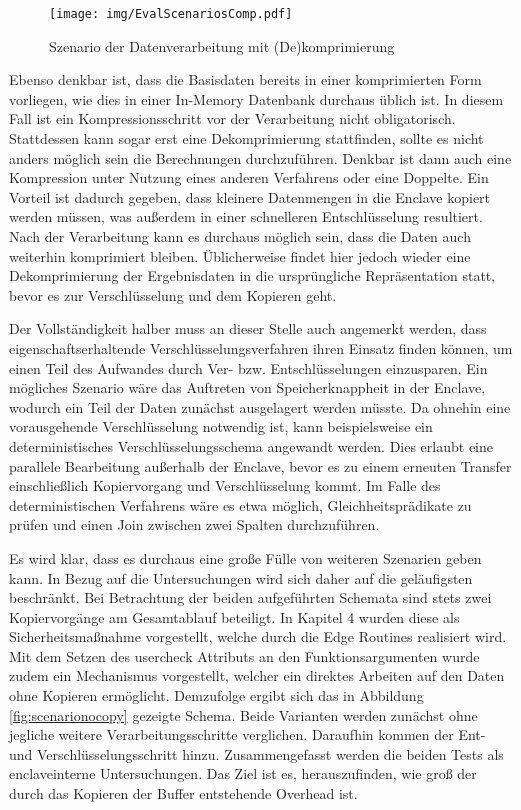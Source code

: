 \begin{figure}[h]
	\texttt{[image: img/EvalScenariosComp.pdf]}
	\centering
	\caption{Szenario der Datenverarbeitung mit (De)komprimierung}
	\label{fig:scenariocomp}
\end{figure}

Ebenso denkbar ist, dass die Basisdaten bereits in einer komprimierten Form vorliegen, wie dies in einer In-Memory Datenbank durchaus üblich ist. In diesem Fall ist ein Kompressionsschritt vor der Verarbeitung nicht obligatorisch. Stattdessen kann sogar erst eine Dekomprimierung stattfinden, sollte es nicht anders möglich sein die Berechnungen durchzuführen. Denkbar ist dann auch eine Kompression unter Nutzung eines anderen Verfahrens oder eine Doppelte. Ein Vorteil ist dadurch gegeben, dass kleinere Datenmengen in die Enclave kopiert werden müssen, was außerdem in einer schnelleren Entschlüsselung resultiert. Nach der Verarbeitung kann es durchaus möglich sein, dass die Daten auch weiterhin komprimiert bleiben. Üblicherweise findet hier jedoch wieder eine Dekomprimierung der Ergebnisdaten in die ursprüngliche Repräsentation statt, bevor es zur Verschlüsselung und dem Kopieren geht.

Der Vollständigkeit halber muss an dieser Stelle auch angemerkt werden, dass eigenschaftserhaltende Verschlüsselungsverfahren ihren Einsatz finden können, um einen Teil des Aufwandes durch Ver- bzw. Entschlüsselungen einzusparen. Ein mögliches Szenario wäre das Auftreten von Speicherknappheit in der Enclave, wodurch ein Teil der Daten zunächst ausgelagert werden müsste. Da ohnehin eine vorausgehende Verschlüsselung notwendig ist, kann beispielsweise ein deterministisches Verschlüsselungsschema angewandt werden. Dies erlaubt eine parallele Bearbeitung außerhalb der Enclave, bevor es zu einem erneuten Transfer einschließlich Kopiervorgang und Verschlüsselung kommt. Im Falle des deterministischen Verfahrens wäre es etwa möglich, Gleichheitsprädikate zu prüfen und einen Join zwischen zwei Spalten durchzuführen. 

Es wird klar, dass es durchaus eine große Fülle von weiteren Szenarien geben kann. In Bezug auf die Untersuchungen wird sich daher auf die geläufigsten beschränkt. Bei Betrachtung der beiden aufgeführten Schemata sind stets zwei Kopiervorgänge am Gesamtablauf beteiligt. In Kapitel 4 wurden diese als Sicherheitsmaßnahme vorgestellt, welche durch die Edge Routines realisiert wird. Mit dem Setzen des user\textunderscore check Attributs an den Funktionsargumenten wurde zudem ein Mechanismus vorgestellt, welcher ein direktes Arbeiten auf den Daten ohne Kopieren ermöglicht. Demzufolge ergibt sich das in Abbildung \ref{fig:scenarionocopy} gezeigte Schema. Beide Varianten werden zunächst ohne jegliche weitere Verarbeitungsschritte verglichen. Daraufhin kommen der Ent- und Verschlüsselungsschritt hinzu. Zusammengefasst werden die beiden Tests als enclaveinterne Untersuchungen. Das Ziel ist es, herauszufinden, wie groß der durch das Kopieren der Buffer entstehende Overhead ist.

